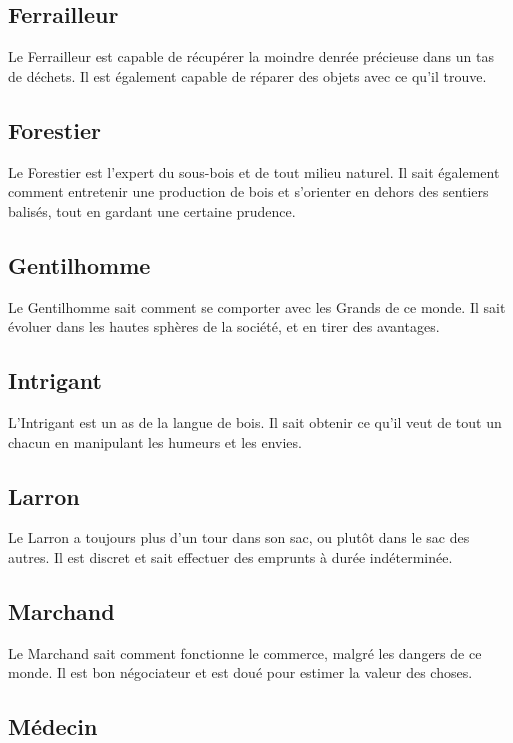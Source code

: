 \documentclass[10pt,twoside,twocolumn,openany,bg=print,justified]{dndbook}
\begin{document}
\subsection*{Ferrailleur}

Le Ferrailleur est capable de récupérer la moindre denrée précieuse dans un tas de déchets. Il est également capable de réparer des objets avec ce qu'il trouve.

\subsection*{Forestier}

Le Forestier est l'expert du sous-bois et de tout milieu naturel. Il sait également comment entretenir une production de bois et s'orienter en dehors des sentiers balisés, tout en gardant une certaine prudence.

\subsection*{Gentilhomme}

Le Gentilhomme sait comment se comporter avec les Grands de ce monde. Il sait évoluer dans les hautes sphères de la société, et en tirer des avantages.

\subsection*{Intrigant}

L'Intrigant est un as de la langue de bois. Il sait obtenir ce qu'il veut de tout un chacun en manipulant les humeurs et les envies.

\subsection*{Larron}

Le Larron a toujours plus d'un tour dans son sac, ou plutôt dans le sac des autres. Il est discret et sait effectuer des emprunts à durée indéterminée.

\subsection*{Marchand}

Le Marchand sait comment fonctionne le commerce, malgré les dangers de ce monde. Il est bon négociateur et est doué pour estimer la valeur des choses.

\subsection*{Médecin}
\end{document}
